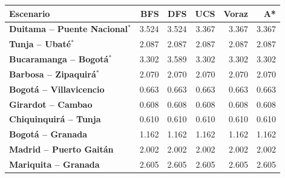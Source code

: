 \renewcommand{\arraystretch}{1.2}
\begin{tabular}{|l|r|r|r|r|r|}
\hline
\rowcolor{gray!20} \textbf{Escenario} & \textbf{BFS} & \textbf{DFS} & \textbf{UCS} & \textbf{Voraz} & \textbf{A*} \\
\hline
\textbf{Duitama -- Puente Nacional$^{*}$} & 3.524 & 3.524 & 3.367 & 3.367 & 3.367 \\
\hline
\textbf{Tunja -- Ubaté$^{*}$} & 2.087 & 2.087 & 2.087 & 2.087 & 2.087 \\
\hline
\textbf{Bucaramanga -- Bogotá$^{*}$} & 3.302 & 3.589 & 3.302 & 3.302 & 3.302 \\
\hline
\textbf{Barbosa -- Zipaquirá$^{*}$} & 2.070 & 2.070 & 2.070 & 2.070 & 2.070 \\
\hline
\textbf{Bogotá -- Villavicencio} & 0.663 & 0.663 & 0.663 & 0.663 & 0.663 \\
\hline
\textbf{Girardot -- Cambao} & 0.608 & 0.608 & 0.608 & 0.608 & 0.608 \\
\hline
\textbf{Chiquinquirá -- Tunja} & 0.610 & 0.610 & 0.610 & 0.610 & 0.610 \\
\hline
\textbf{Bogotá -- Granada} & 1.162 & 1.162 & 1.162 & 1.162 & 1.162 \\
\hline
\textbf{Madrid -- Puerto Gaitán} & 2.002 & 2.002 & 2.002 & 2.002 & 2.002 \\
\hline
\textbf{Mariquita -- Granada} & 2.605 & 2.605 & 2.605 & 2.605 & 2.605 \\
\hline
\end{tabular}
